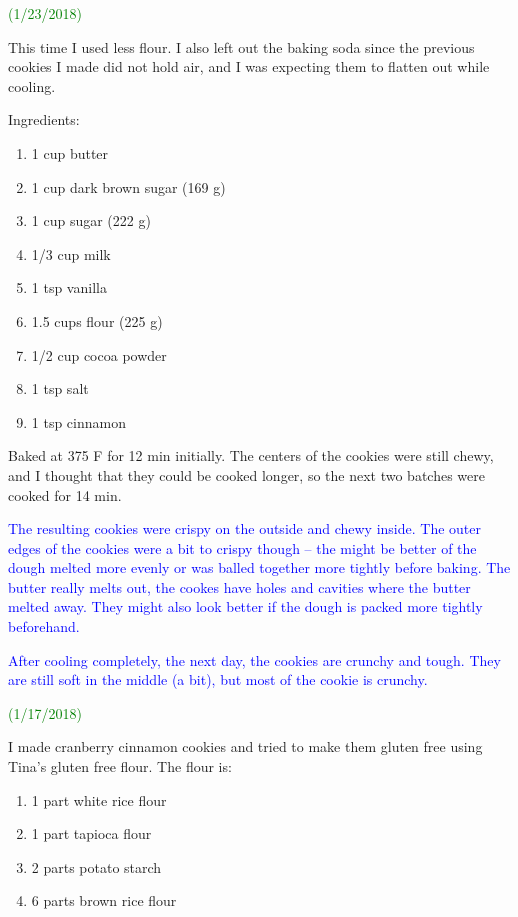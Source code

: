 \documentclass[11pt]{article}
\begin{document}
\textcolor{green}{(1/23/2018)}

This time I used less flour.  I also left out the baking soda since the previous cookies I made did not hold air, and I was expecting them to flatten out while cooling.

Ingredients:

\begin{enumerate}
\item 1 cup butter
\item 1 cup dark brown sugar (169 g)
\item 1 cup sugar (222 g)
\item 1/3 cup milk
\item 1 tsp vanilla
\item 1.5 cups flour (225 g)
\item 1/2 cup cocoa powder
\item 1 tsp salt
\item 1 tsp cinnamon
\end{enumerate}

Baked at 375 F for 12 min initially.  The centers of the cookies were still chewy, and I thought that they could be cooked longer, so the next two batches were cooked for 14 min.  

\textcolor{blue}{The resulting cookies were crispy on the outside and chewy inside.  The outer edges of the cookies were a bit to crispy though -- the might be better of the dough melted more evenly or was balled together more tightly before baking.  The butter really melts out, the cookes have holes and cavities where the butter melted away.  They might also look better if the dough is packed more tightly beforehand.

After cooling completely, the next day, the cookies are crunchy and tough.  They are still soft in the middle (a bit), but most of the cookie is crunchy.}

\hrulefill

\textcolor{green}{(1/17/2018)}

I made cranberry cinnamon cookies and tried to make them gluten free using Tina's gluten free flour.  The flour is: 

\begin{enumerate}
\item 1 part white rice flour
\item 1 part tapioca flour
\item 2 parts potato starch
\item 6 parts brown rice flour
\end{enumerate}
\end{document}
